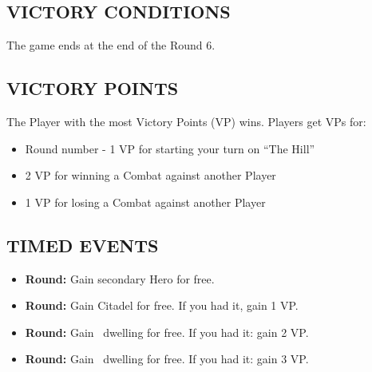 \begin{multicols*}{2}
\subsection*{\MakeUppercase{Victory Conditions}}
The game ends at the end of the Round 6.

\subsection*{\MakeUppercase{Victory Points}}
The Player with the most Victory Points (VP) wins. Players get
VPs for:
\begin{itemize}
  \item Round number - 1 VP for starting your turn on ``The Hill''
  \item 2 VP for winning a Combat against another Player
  \item 1 VP for losing a Combat against another Player
\end{itemize}

\subsection*{\MakeUppercase{Timed Events}}

\begin{itemize}
  \item \textbf{ Round:} Gain secondary Hero for free.
  \item \textbf{ Round:} Gain Citadel for free. If you had it, gain 1 VP.
  \item \textbf{ Round:} Gain \silver\ dwelling for free. If you had it: gain 2 VP.
  \item \textbf{ Round:} Gain \golden\ dwelling for free. If you had it: gain 3 VP.
\end{itemize}


\end{multicols*}
